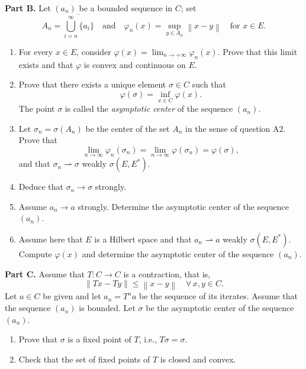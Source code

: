 \documentclass[12pt]{article}
\newcommand{\norm}[1]{\left\|#1\right\|}
\begin{document}
\noindent\textbf{Part B.} Let $(a_n)$ be a bounded sequence in $C$; set
\[
A_n = \overline{\bigcup_{i=n}^\infty \{a_i\}}
\quad \text{and} \quad
\varphi_n(x) = \sup_{y \in A_n} \norm{x-y} \quad \text{for } x \in E.
\]

\begin{enumerate}
\item For every $x \in E$, consider $\varphi(x) = \lim_{n \to +\infty} \varphi_n(x)$. Prove that this
limit exists and that $\varphi$ is convex and continuous on $E$.

\item Prove that there exists a unique element $\sigma \in C$ such that
\[
\varphi(\sigma) = \inf_{x \in C} \varphi(x).
\]
The point $\sigma$ is called the \emph{asymptotic center} of the sequence $(a_n)$.

\item Let $\sigma_n = \sigma(A_n)$ be the center of the set $A_n$ in the sense of question A2. Prove that
\[
\lim_{n \to \infty} \varphi_n(\sigma_n) = \lim_{n \to \infty} \varphi(\sigma_n) = \varphi(\sigma),
\]
and that $\sigma_n \rightharpoonup \sigma$ weakly $\sigma(E, E^*)$.

\item Deduce that $\sigma_n \to \sigma$ strongly.


\item Assume $a_n \to a$ strongly. Determine the asymptotic center of the sequence $(a_n)$.

\item Assume here that $E$ is a Hilbert space and that $a_n \rightharpoonup a$ weakly $\sigma(E, E^*)$.
Compute $\varphi(x)$ and determine the asymptotic center of the sequence $(a_n)$.

\end{enumerate}

\noindent\textbf{Part C.} Assume that $T : C \to C$ is a contraction, that is,
\[
\norm{Tx - Ty} \le \norm{x - y} \quad \forall\, x, y \in C.
\]
Let $a \in C$ be given and let $a_n = T^n a$ be the sequence of its iterates. Assume that
the sequence $(a_n)$ is bounded. Let $\sigma$ be the asymptotic center of the sequence $(a_n)$.

\begin{enumerate}
\item Prove that $\sigma$ is a fixed point of $T$, i.e., $T\sigma = \sigma$.

\item Check that the set of fixed points of $T$ is closed and convex.
\end{enumerate}
\end{document}
